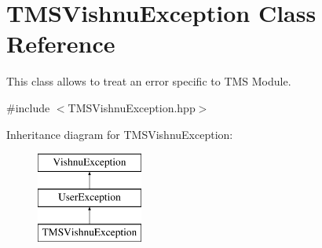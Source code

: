 \hypertarget{classTMSVishnuException}{
\section{TMSVishnuException Class Reference}
\label{classTMSVishnuException}
}


This class allows to treat an error specific to TMS Module.  




{\ttfamily \#include $<$TMSVishnuException.hpp$>$}

Inheritance diagram for TMSVishnuException:\begin{figure}[H]
\begin{center}
\leavevmode
\includegraphics[height=3.000000cm]{classTMSVishnuException}
\end{center}
\end{figure}
